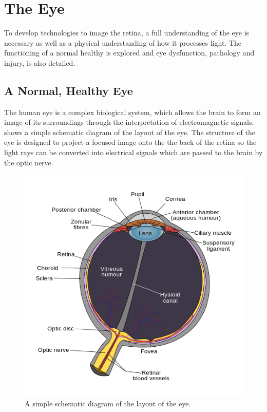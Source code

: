 
\chapter{The Eye}

\label{anatomy}

To develop technologies to image the retina, a full understanding of the eye is
necessary as well as a physical understanding of how it processes light. The
functioning of a normal healthy is explored and eye dysfunction, pathology and
injury, is also detailed.

\section{A Normal, Healthy Eye}

The human eye is a complex biological system, which allows the brain to
form an image of its surroundings through the interpretation of
electromagnetic signals.  shows a simple schematic
diagram of the layout of the eye. The structure of the eye is designed to
project a focused image onto the the back of the retina so the light rays
can be converted into electrical signals which are passed to the brain by
the optic nerve.

\begin{figure}[H]
\centering
  \includegraphics{figures/schematic_diagram_of_the_human_eye}
\caption{A simple schematic diagram of the layout of the eye.\cite{wikiRhcastilhos}}
\label{fig:eye_simple}
\end{figure}

